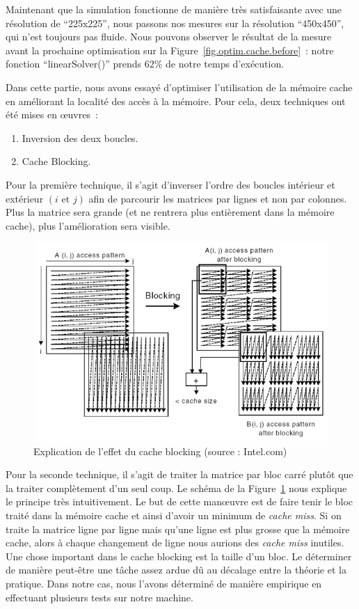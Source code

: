 \documentclass[12pt,a4paper]{article}
\begin{document}
Maintenant que la simulation fonctionne de manière très satisfaisante avec une
résolution de \enquote{225x225}, nous passons nos mesures sur la résolution
\enquote{450x450}, qui n’est toujours pas fluide. Nous pouvons observer le
résultat de la mesure avant la prochaine optimisation sur la
Figure~\ref{fig.optim.cache.before} : notre fonction \enquote{linearSolver()}
prends $62\%$ de notre temps d’exécution.

Dans cette partie, nous avons essayé d’optimiser l’utilisation de la mémoire
cache en améliorant la localité des accès à la mémoire. Pour cela, deux
techniques ont été mises en œuvres :
\begin{enumerate}
    \item Inversion des deux boucles.
    \item Cache Blocking.
\end{enumerate}

Pour la première technique, il s’agit d’inverser l’ordre des boucles intérieur
et extérieur $(i \text{ et } j)$ afin de parcourir les matrices par lignes et
non par colonnes. Plus la matrice sera grande (et ne rentrera plus entièrement
dans la mémoire cache), plus l’amélioration sera visible.

\begin{figure}
    \centering
    \includegraphics[scale=0.5]{figures/optims/cache/intel.jpg}
    \caption{Explication de l'effet du cache blocking (source : Intel.com)}
    \label{fig.optim.cache.intel}
\end{figure}

Pour la seconde technique, il s’agit de traiter la matrice par bloc carré plutôt
que la traiter complètement d’un seul coup. Le schéma de la
Figure~\ref{fig.optim.cache.intel} nous explique le principe très intuitivement.
Le but de cette manœuvre est de faire tenir le bloc traité dans la mémoire cache
et ainsi d’avoir un minimum de \textit{cache miss}. Si on traite la matrice
ligne par ligne mais qu’une ligne est plus grosse que la mémoire cache, alors à
chaque changement de ligne nous aurions des \textit{cache miss} inutiles. Une
chose important dans le cache blocking est la taille d’un bloc. Le déterminer de
manière peut-être une tâche assez ardue dû au décalage entre la théorie et la
pratique. Dans notre cas, nous l’avons déterminé de manière empirique en
effectuant plusieurs tests sur notre machine.
\end{document}

